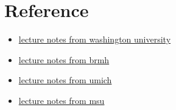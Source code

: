 \section{Reference}
\begin{itemize}
    \item \href{https://sites.math.washington.edu/~burke/crs/555/555_notes/hilbert.pdf}{lecture notes from washington university}
    \item \href{https://web.mat.bham.ac.uk/~malevao/MSM3P21/l12.pdf}{lecture notes from brmh}
    \item \href{https://web.eecs.umich.edu/~fessler/course/600/l/l03.pdf}{lecture notes from umich}
    \item \href{https://users.math.msu.edu/users/banelson/teaching/920/chI_notes.pdf}{lecture notes from msu}
\end{itemize}


